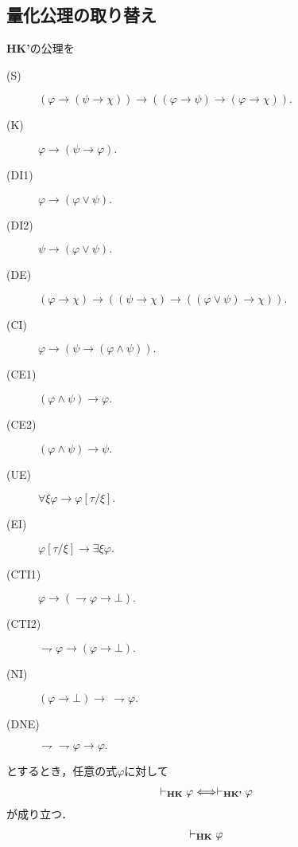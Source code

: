 \subsection{量化公理の取り替え}
	{\bf HK'}の公理を
	\begin{screen}
		\begin{description}
			\item[(S)] $(\varphi \rightarrow (\psi \rightarrow \chi)) 
				\rightarrow ((\varphi \rightarrow \psi)
				\rightarrow (\varphi \rightarrow \chi)).$
			\item[(K)] $\varphi \rightarrow (\psi \rightarrow \varphi).$
			\item[(DI1)] $\varphi \rightarrow (\varphi \vee \psi).$
			\item[(DI2)] $\psi \rightarrow (\varphi \vee \psi).$
			\item[(DE)] $(\varphi \rightarrow \chi) \rightarrow 
				((\psi \rightarrow \chi) \rightarrow ((\varphi \vee \psi) \rightarrow \chi)).$
			\item[(CI)] $\varphi \rightarrow (\psi \rightarrow (\varphi \wedge \psi)).$
			\item[(CE1)] $(\varphi \wedge \psi) \rightarrow \varphi.$
			\item[(CE2)] $(\varphi \wedge \psi) \rightarrow \psi.$
			
			\item[(UE)] $\forall \xi \varphi \rightarrow \varphi[\tau/\xi].$
			\item[(EI)] $\varphi[\tau/\xi] \rightarrow \exists \xi \varphi.$
			
			\item[(CTI1)] $\varphi \rightarrow (\rightharpoondown \varphi \rightarrow \bot).$
			
			\item[(CTI2)] $\rightharpoondown \varphi \rightarrow (\varphi \rightarrow \bot).$
			
			\item[(NI)] $(\varphi \rightarrow \bot) \rightarrow\ \rightharpoondown \varphi.$
			\item[(DNE)] $\rightharpoondown \rightharpoondown \varphi \rightarrow \varphi.$
		\end{description}
	\end{screen}
	とするとき，任意の式$\varphi$に対して
	\begin{align}
		\vdash_{{\scriptsize \mbox{{\bf HK}}}} \varphi
		\Longleftrightarrow \vdash_{{\scriptsize \mbox{{\bf HK'}}}} \varphi
	\end{align}
	が成り立つ．
	\begin{align}
		\vdash_{{\scriptsize \mbox{{\bf HK}}}} \varphi
	\end{align}
